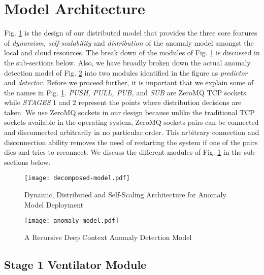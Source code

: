 \section{Model Architecture}
\label{sec:design}
Fig. \ref{fig:distributed-architecture} is the design of our distributed model 
that provides the three core features of \emph{dynamism, self-scalability} and 
\emph{distribution} of the anomaly model amongst the local and cloud resources. 
The break down of the modules of Fig. \ref{fig:distributed-architecture} is 
discussed in the sub-sections below. Also, we have broadly broken down the 
actual anomaly detection model of Fig. \ref{fig:deep-model} into two modules 
identified in the figure as \emph{predictor} and \emph{detector}. Before we 
proceed further, it is important that we explain some of the names in Fig. 
\ref{fig:distributed-architecture}. \emph{PUSH, PULL, PUB,} and \emph{SUB} are 
ZeroMQ TCP sockets while \emph{STAGES} $ 1 $ and $ 2 $ represent the points 
where distribution decisions are taken. We use ZeroMQ sockets in our design 
because unlike the traditional TCP sockets available in the operating system, 
ZeroMQ sockets pairs can be connected and disconnected arbitrarily in no 
particular order. This arbitrary connection and disconnection ability removes 
the need of restarting the system if one of the pairs dies and tries to 
reconnect. We discuss the different modules of Fig. 
\ref{fig:distributed-architecture} in the sub-sections below.
\begin{figure}[!t]
	\centering
	\texttt{[image: decomposed-model.pdf]}
	\caption{Dynamic, Distributed and Self-Scaling Architecture for Anomaly 
	Model Deployment}
	\label{fig:distributed-architecture}
\end{figure}


\begin{figure}[!t]
	\centering
	\texttt{[image: anomaly-model.pdf]} 
	\caption{A Recursive Deep Context Anomaly Detection Model 
	}
	\label{fig:deep-model}
\end{figure}

\subsection{Stage 1 Ventilator Module}
\label{subsec:stage1}
